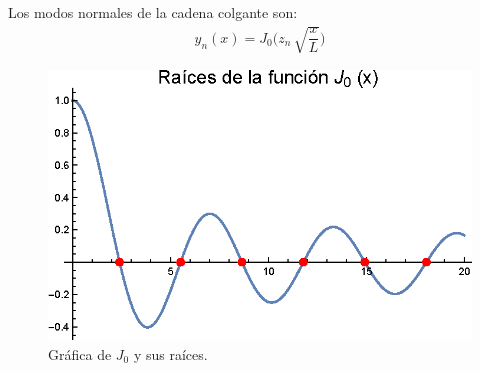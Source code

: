 Los modos normales de la cadena colgante son:
\begin{align}
y_{n} (x) = J_{0} \bigg( z_{n} \, \sqrt{\dfrac{x}{L}} \bigg)
\label{eq:ecuacion_28}
\end{align}
\begin{figure}[H]
    \centering
    \includegraphics[scale=1.2]{Imagenes/Plot_Bessel_Cadena_01_Raices_J0.eps}
    \caption{Gráfica de $J_{0}$ y sus raíces.}
    \label{fig:figura_raices_J0}
\end{figure}
